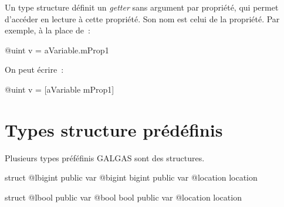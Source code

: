 %
%
%
%






Un type structure définit un \emph{getter} sans argument par propriété, qui permet d'accéder en lecture à cette propriété. Son nom est celui de la propriété. Par exemple, à la place de~:
\begin{galgas3}
@uint v = aVariable.mProp1
\end{galgas3}

On peut écrire~:
\begin{galgas3}
@uint v = [aVariable mProp1]
\end{galgas3}








\section{Types structure prédéfinis}

Plusieurs types préféfinis GALGAS sont des structures.


\begin{galgas34}
struct @lbigint {
  public var @bigint bigint
  public var @location location
}
\end{galgas34}




\begin{galgas34}
struct @lbool {
  public var @bool bool
  public var @location location
}
\end{galgas34}



